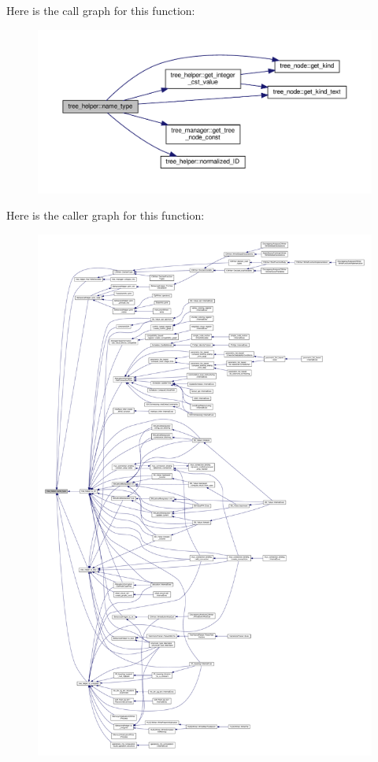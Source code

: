 Here is the call graph for this function\+:
\nopagebreak
\begin{figure}[H]
\begin{center}
\leavevmode
\includegraphics[width=350pt]{d7/d99/classtree__helper_aee00603ba1624687633e55453f315687_cgraph}
\end{center}
\end{figure}
Here is the caller graph for this function\+:
\nopagebreak
\begin{figure}[H]
\begin{center}
\leavevmode
\includegraphics[width=350pt]{d7/d99/classtree__helper_aee00603ba1624687633e55453f315687_icgraph}
\end{center}
\end{figure}
\mbox{\label{classtree__helper_a6164be0a320aaf2cbc0e5f328dbdf884}} 
